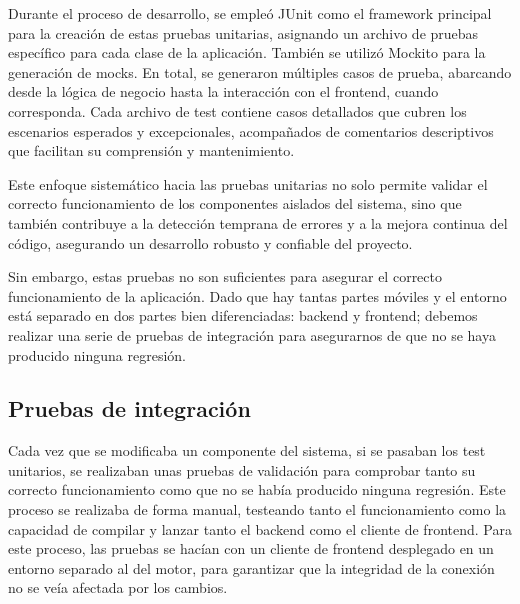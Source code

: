Durante el proceso de desarrollo, se empleó JUnit como el framework principal para la creación de estas pruebas unitarias, asignando un archivo de pruebas específico para cada clase de la aplicación. También se utilizó Mockito para la generación de mocks. En total, se generaron múltiples casos de prueba, abarcando desde la lógica de negocio hasta la interacción con el frontend, cuando corresponda. Cada archivo de test contiene casos detallados que cubren los escenarios esperados y excepcionales, acompañados de comentarios descriptivos que facilitan su comprensión y mantenimiento.

Este enfoque sistemático hacia las pruebas unitarias no solo permite validar el correcto funcionamiento de los componentes aislados del sistema, sino que también contribuye a la detección temprana de errores y a la mejora continua del código, asegurando un desarrollo robusto y confiable del proyecto.

Sin embargo, estas pruebas no son suficientes para asegurar el correcto funcionamiento de la aplicación. Dado que hay tantas partes móviles y el entorno está separado en dos partes bien diferenciadas: backend y frontend; debemos realizar una serie de pruebas de integración para asegurarnos de que no se haya producido ninguna regresión.

\subsection{Pruebas de integración}
Cada vez que se modificaba un componente del sistema, si se pasaban los test unitarios, se realizaban unas pruebas de validación para comprobar tanto su correcto funcionamiento como que no se había producido ninguna regresión. Este proceso se realizaba de forma manual, testeando tanto el funcionamiento como la capacidad de compilar y lanzar tanto el backend como el cliente de frontend. Para este proceso, las pruebas se hacían con un cliente de frontend desplegado en un entorno separado al del motor, para garantizar que la integridad de la conexión no se veía afectada por los cambios. 